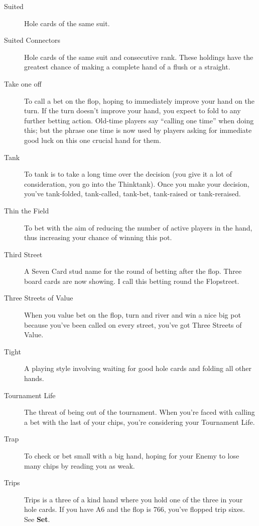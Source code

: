 \begin{description}
\item[Suited] Hole cards of the same suit.

\item[Suited Connectors] Hole cards of the same suit and consecutive
rank. These holdings have the greatest chance of making a complete hand of
a flush or a straight.

\item[Take one off] To call a bet on the flop, hoping to immediately
improve your hand on the turn. If the turn doesn't improve your hand,
you expect to fold to any further betting action. Old-time players say
``calling one time'' when doing this; but the phrase one time is now
used by players asking for immediate good luck on this one crucial
hand for them.

\item[Tank] To tank is to take a long time over the decision
(you give it a lot of consideration, you go into the Thinktank).
Once you make your decision, you've tank-folded, tank-called, tank-bet,
tank-raised or tank-reraised.

\item[Thin the Field] To bet with the aim of reducing the number of
active players in the hand, thus increasing your chance of winning
this pot.

\item[Third Street] A Seven Card stud name for the round of betting
after the flop. Three board cards are now showing. I call this betting
round the Flopstreet.

\item[Three Streets of Value] When you value bet on the flop, turn
and river and win a nice big pot because you've been called on every
street, you've got Three Streets of Value.

\item[Tight] A playing style involving waiting for good hole cards and
folding all other hands.

\item[Tournament Life] The threat of being out of the tournament. When
you're faced with calling a bet with the last of your chips, you're
considering your Tournament Life.

\item[Trap] To check or bet small with a big hand, hoping for your Enemy
to lose many chips by reading you as weak.

\item[Trips] Trips is a three of a kind hand where you hold one of the
three in your hole cards. If you have A6 and the flop is 766, you've
flopped trip sixes. See \textbf{Set}.


\end{description}
